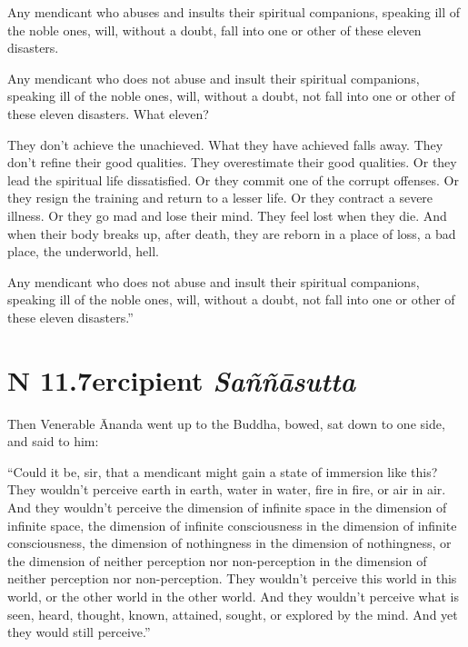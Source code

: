 \documentclass[12pt,openany]{book}%
\newcommand*{\suttatitleacronym}[1]{\smaller[2]{#1}\vspace*{.3em}}
\newcommand*{\suttatitletranslation}[1]{\linebreak{#1}}
\newcommand*{\suttatitleroot}[1]{\linebreak\smaller[2]\itshape{#1}}
\newcommand*{\tocacronym}[1]{\hspace*{-3.3em}{#1}\quad}
\newcommand*{\toctranslation}[1]{#1}
\newcommand*{\tocroot}[1]{(\textit{#1})}
\begin{document}
Any mendicant who abuses and insults their spiritual companions, speaking ill of the noble ones, will, without a doubt, fall into one or other of these eleven disasters. 

Any mendicant who does not abuse and insult their spiritual companions, speaking ill of the noble ones, will, without a doubt, not fall into one or other of these eleven disasters. What eleven? 

They don’t achieve the unachieved. What they have achieved falls away. They don’t refine their good qualities. They overestimate their good qualities. Or they lead the spiritual life dissatisfied. Or they commit one of the corrupt offenses. Or they resign the training and return to a lesser life. Or they contract a severe illness. Or they go mad and lose their mind. They feel lost when they die. And when their body breaks up, after death, they are reborn in a place of loss, a bad place, the underworld, hell. 

Any mendicant who does not abuse and insult their spiritual companions, speaking ill of the noble ones, will, without a doubt, not fall into one or other of these eleven disasters.” 

%
\section*{{\suttatitleacronym AN 11.7}{\suttatitletranslation Percipient }{\suttatitleroot Saññāsutta}}
\addcontentsline{toc}{section}{\tocacronym{AN 11.7} \toctranslation{Percipient } \tocroot{Saññāsutta}}

Then Venerable Ānanda went up to the Buddha, bowed, sat down to one side, and said to him: 

“Could it be, sir, that a mendicant might gain a state of immersion like this? They wouldn’t perceive earth in earth, water in water, fire in fire, or air in air. And they wouldn’t perceive the dimension of infinite space in the dimension of infinite space, the dimension of infinite consciousness in the dimension of infinite consciousness, the dimension of nothingness in the dimension of nothingness, or the dimension of neither perception nor non-perception in the dimension of neither perception nor non-perception. They wouldn’t perceive this world in this world, or the other world in the other world. And they wouldn’t perceive what is seen, heard, thought, known, attained, sought, or explored by the mind. And yet they would still perceive.” 
\end{document}
